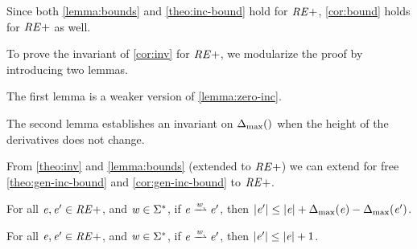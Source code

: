 Since both \cref{lemma:bounds} and \cref{theo:inc-bound} hold for $\mathit {RE+}$, \cref{cor:bound} holds for $\mathit {RE+}$ as well.

To prove the invariant of \cref{cor:inv} for $\mathit {RE+}$, we modularize the proof by introducing two lemmas.

The first lemma is a weaker version of \cref{lemma:zero-inc}.


The second lemma establishes an invariant on ${\Delta_{\max}}({})$ when the height of the derivatives does not change.



From \cref{theo:inv} and \cref{lemma:bounds} (extended to $\mathit {RE+}$) we can
extend for free \cref{theo:gen-inc-bound} and \cref{cor:gen-inc-bound}  to $\mathit {RE+}$.

\begin{theorem}
 For all $\mathit {e},\mathit {e}'\in\mathit {RE+}$, and $\mathit {w}\in\Sigma^*$, if $\re\parDer{\word}\re'$, then ${\mid}{\mathit {e}'}{\mid}\leq{\mid}{\ensuremath{\mathit {e}}}{\mid}+{\Delta_{\max}}({\mathit {e}})-{\Delta_{\max}}({\mathit {e}'})$.
\end{theorem}

\begin{corollary}
 For all $\mathit {e},\mathit {e}'\in\mathit {RE+}$, and $\mathit {w}\in\Sigma^*$, if $\re\parDer{\word}\re'$, then ${\mid}{\mathit {e}'}{\mid}\leq{\mid}{\ensuremath{\mathit {e}}}{\mid}+1$.
\end{corollary}




